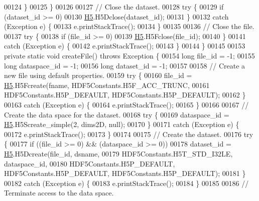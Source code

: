 \begin{DoxyCode}
00124             \}
00125         \}
00126 
00127         \textcolor{comment}{// Close the dataset.}
00128         \textcolor{keywordflow}{try} \{
00129             \textcolor{keywordflow}{if} (dataset\_id >= 0)
00130                 \hyperlink{namespace_h5}{H5}.H5Dclose(dataset\_id);
00131         \}
00132         \textcolor{keywordflow}{catch} (Exception e) \{
00133             e.printStackTrace();
00134         \}
00135 
00136         \textcolor{comment}{// Close the file.}
00137         \textcolor{keywordflow}{try} \{
00138             \textcolor{keywordflow}{if} (file\_id >= 0)
00139                 \hyperlink{namespace_h5}{H5}.H5Fclose(file\_id);
00140         \}
00141         \textcolor{keywordflow}{catch} (Exception e) \{
00142             e.printStackTrace();
00143         \}
00144     \}
00145 
00153     \textcolor{keyword}{private} \textcolor{keyword}{static} \textcolor{keywordtype}{void} createFile() throws Exception \{
00154         \textcolor{keywordtype}{long} file\_id = -1;
00155         \textcolor{keywordtype}{long} dataspace\_id = -1;
00156         \textcolor{keywordtype}{long} dataset\_id = -1;
00157 
00158         \textcolor{comment}{// Create a new file using default properties.}
00159         \textcolor{keywordflow}{try} \{
00160             file\_id = \hyperlink{namespace_h5}{H5}.H5Fcreate(fname, HDF5Constants.H5F\_ACC\_TRUNC,
00161                     HDF5Constants.H5P\_DEFAULT, HDF5Constants.H5P\_DEFAULT);
00162         \}
00163         \textcolor{keywordflow}{catch} (Exception e) \{
00164             e.printStackTrace();
00165         \}
00166 
00167         \textcolor{comment}{// Create the data space for the dataset.}
00168         \textcolor{keywordflow}{try} \{
00169             dataspace\_id = \hyperlink{namespace_h5}{H5}.H5Screate\_simple(2, dims2D, null);
00170         \}
00171         \textcolor{keywordflow}{catch} (Exception e) \{
00172             e.printStackTrace();
00173         \}
00174 
00175         \textcolor{comment}{// Create the dataset.}
00176         \textcolor{keywordflow}{try} \{
00177             \textcolor{keywordflow}{if} ((file\_id >= 0) && (dataspace\_id >= 0))
00178                 dataset\_id = \hyperlink{namespace_h5}{H5}.H5Dcreate(file\_id, dsname,
00179                         HDF5Constants.H5T\_STD\_I32LE, dataspace\_id,
00180                         HDF5Constants.H5P\_DEFAULT, HDF5Constants.H5P\_DEFAULT, HDF5Constants.H5P\_DEFAULT);
00181         \}
00182         \textcolor{keywordflow}{catch} (Exception e) \{
00183             e.printStackTrace();
00184         \}
00185 
00186         \textcolor{comment}{// Terminate access to the data space.}

\end{DoxyCode}
